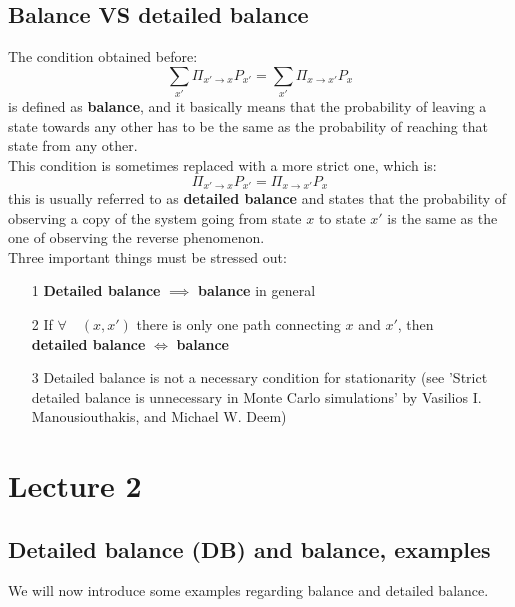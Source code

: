 \subsection{Balance VS detailed balance}
The condition obtained before:
\begin{equation*}
    \sum_{x'}\Pi_{x' \rightarrow x}P_{x'} = \sum_{x'}\Pi_{x \rightarrow x'}P_{x}
\end{equation*}
is defined as \textbf{balance}, and it basically means that the probability of leaving a state towards any other has to be the same as the probability of reaching that state from any other.\\
This condition is sometimes replaced with a more strict one, which is:
\begin{equation*}
    \Pi_{x' \rightarrow x}P_{x'} = \Pi_{x \rightarrow x'}P_{x}
\end{equation*}
this is usually referred to as \textbf{detailed balance} and states that the probability of observing a copy of the system going from state $x$ to state $x'$ is the same as the one of observing the reverse phenomenon.\\
Three important things must be stressed out:
\begin{itemize}
    \item[1] \textbf{Detailed balance} $\implies$ \textbf{balance} in general
    \item[2] If $\forall \quad (x, x')$ there is only one path connecting $x$ and $x'$, then\\
    \textbf{detailed balance} $\iff$ \textbf{balance}
    \item[3] Detailed balance is not a necessary condition for stationarity (see 'Strict detailed balance is unnecessary in Monte Carlo simulations' by Vasilios I. Manousiouthakis, and Michael W. Deem)
\end{itemize}
\section{Lecture 2}
\subsection{Detailed balance (DB) and balance, examples}
We will now introduce some examples regarding balance and detailed balance.

